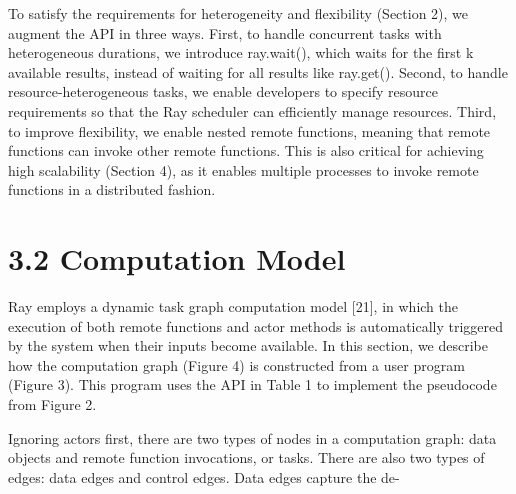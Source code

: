 \documentclass[
]{article}
\begin{document}
To satisfy the requirements for heterogeneity and flexibility (Section
2), we augment the API in three ways. First, to handle concurrent tasks
with heterogeneous durations, we introduce ray.wait(), which waits for
the first k available results, instead of waiting for all results like
ray.get(). Second, to handle resource-heterogeneous tasks, we enable
developers to specify resource requirements so that the Ray scheduler
can efficiently manage resources. Third, to improve flexibility, we
enable nested remote functions, meaning that remote functions can invoke
other remote functions. This is also critical for achieving high
scalability (Section 4), as it enables multiple processes to invoke
remote functions in a distributed fashion.

\section{3.2 Computation Model}\label{computation-model}

Ray employs a dynamic task graph computation model {[}21{]}, in which
the execution of both remote functions and actor methods is
automatically triggered by the system when their inputs become
available. In this section, we describe how the computation graph
(Figure 4) is constructed from a user program (Figure 3). This program
uses the API in Table 1 to implement the pseudocode from Figure 2.

Ignoring actors first, there are two types of nodes in a computation
graph: data objects and remote function invocations, or tasks. There are
also two types of edges: data edges and control edges. Data edges
capture the de-
\end{document}

